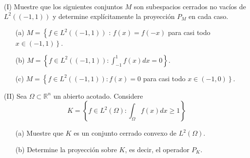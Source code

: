  (I) Muestre que los siguientes conjuntos $M$ son subespacios cerrados no vacíos de $L^2((-1,1))$ y determine explícitamente la proyección $P_M$ en cada caso.
 \begin{itemize}
     

\item[(a)] $M=\left\{f \in L^2((-1,1))\right.$ : $f(x)=f(-x)$ para casi todo $\left.x \in(-1,1)\right\}$.
\item[(b)] $M=\left\{f \in L^2((-1,1)): \int_{-1}^1 f(x) d x=0\right\}$.
\item[(c)] $M=\left\{f \in L^2((-1,1)): f(x)=0\right.$ para casi todo $\left.x \in(-1,0)\right\}$.
 \end{itemize}
(II) Sea $\Omega \subset \mathbb{R}^n$ un abierto acotado. Considere
$$
K=\left\{f \in L^2(\Omega): \int_{\Omega} f(x) d x \geq 1\right\}
$$
\begin{itemize}
\item[(a)] Muestre que $K$ es un conjunto cerrado convexo de $L^2(\Omega)$.
\item[(b)] Determine la proyección sobre $K$, es decir, el operador $P_K$.
\end{itemize}


